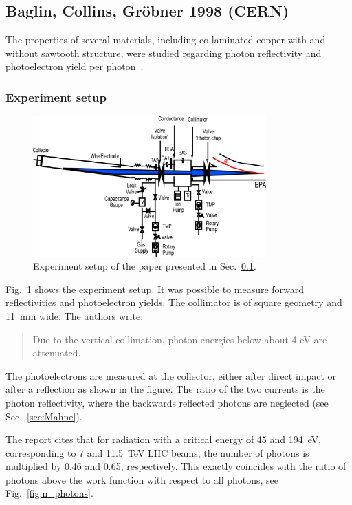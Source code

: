 \subsection{Baglin, Collins, Gröbner 1998 (CERN)}
\label{sec:Baglin}

The properties of several materials, including co-laminated copper with and without sawtooth structure, were studied regarding photon reflectivity and photoelectron yield per photon~\cite{baglin}.

\subsubsection{Experiment setup}

\begin{figure}[tbh]
    \centering
    \includegraphics[width=0.8\textwidth]{../ss/experiment_baglin.png}
    \caption{Experiment setup of the paper presented in Sec.~\ref{sec:Baglin}.}
    \label{fig:exp}
\end{figure}


Fig.~\ref{fig:exp} shows the experiment setup.
It was possible to measure forward reflectivities and photoelectron yields.
The collimator is of square geometry and 11~mm wide.
The authors write:
\begin{quote}
    \small
    Due to the vertical collimation, photon energies below about 4 eV are attenuated.
\end{quote}

The photoelectrons are measured at the collector, either after direct impact or after a reflection as shown in the figure.
The ratio of the two currents is the photon reflectivity, where the backwards reflected photons are neglected (see Sec.~\ref{sec:Mahne}).

The report cites that for radiation with a critical energy of 45 and 194~eV, corresponding to 7 and 11.5~TeV LHC beams, the number of photons is multiplied by 0.46 and 0.65, respectively.
This exactly coincides with the ratio of photons above the work function with respect to all photons, see Fig.~\ref{fig:n_photons}.



